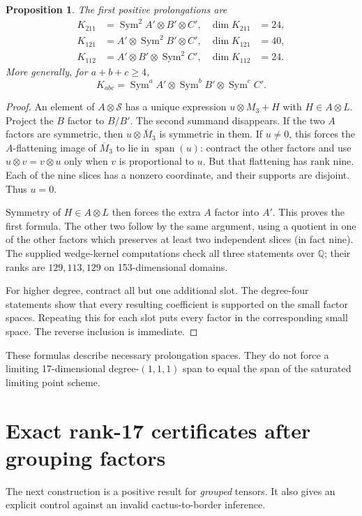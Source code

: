 \documentclass[11pt]{article}
\newtheorem{proposition}[theorem]{Proposition}
\theoremstyle{definition}\newtheorem{definition}[theorem]{Definition}
\theoremstyle{remark}\newtheorem{remark}[theorem]{Remark}
\newcommand{\Q}{\mathbb Q}
\newcommand{\Span}{\operatorname{span}}
\newcommand{\Sym}{\operatorname{Sym}}
\newcommand{\calS}{\mathcal S}
\begin{document}
\begin{proposition}\label{prop:prolong}
The first positive prolongations are
\begin{align*}
 K_{211}&=\Sym^2 A'\otimes B'\otimes C',&\dim K_{211}&=24,\\
 K_{121}&=A'\otimes\Sym^2 B'\otimes C',&\dim K_{121}&=40,\\
 K_{112}&=A'\otimes B'\otimes\Sym^2 C',&\dim K_{112}&=24.
\end{align*}
More generally, for $a+b+c\geq4$,
\[
 K_{abc}=\Sym^a A'\otimes\Sym^b B'\otimes\Sym^c C'.
\]
\end{proposition}
\begin{proof}
An element of $A\otimes\calS$ has a unique expression $u\otimes M_3+H$ with
$H\in A\otimes L$. Project the $B$ factor to $B/B'$. The second summand
disappears. If the two $A$ factors are symmetric, then
$u\otimes\overline M_3$ is symmetric in them. If $u\ne0$, this forces the
$A$-flattening image of $\overline M_3$ to lie in $\Span(u)$: contract the
other factors and use $u\otimes v=v\otimes u$ only when $v$ is proportional
to $u$. But that flattening has rank nine. Each of the nine slices has a
nonzero coordinate, and their supports are disjoint. Thus $u=0$.

Symmetry of $H\in A\otimes L$ then forces the extra $A$ factor into $A'$.
This proves the first formula. The other two follow by the same argument,
using a quotient in one of the other factors which preserves at least two
independent slices (in fact nine). The supplied wedge-kernel computations
check all three statements over $\Q$; their ranks are $129,113,129$ on
153-dimensional domains.

For higher degree, contract all but one additional slot. The degree-four
statements show that every resulting coefficient is supported on the small
factor spaces. Repeating this for each slot puts every factor in the
corresponding small space. The reverse inclusion is immediate.
\end{proof}

These formulas describe necessary prolongation spaces. They do not force a
limiting 17-dimensional degree-$(1,1,1)$ span to equal the span of the
saturated limiting point scheme.

\section{Exact rank-17 certificates after grouping factors}

The next construction is a positive result for \emph{grouped} tensors. It
also gives an explicit control against an invalid cactus-to-border inference.
\end{document}
